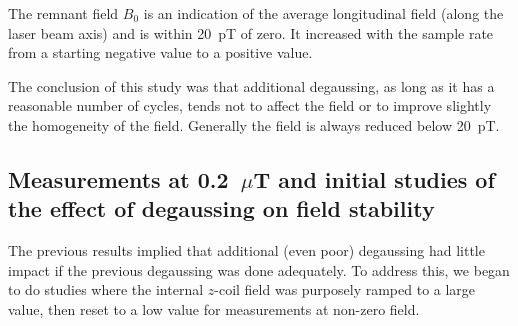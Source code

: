 The remnant field $B_0$ is an indication of the average longitudinal
field (along the laser beam axis) and is within 20~pT of zero.  It
increased with the sample rate from a starting negative value to a
positive value.

The conclusion of this study was that additional degaussing, as long
as it has a reasonable number of cycles, tends not to affect the field
or to improve slightly the homogeneity of the field.  Generally the
field is always reduced below 20~pT.



\subsection{Measurements at 0.2~$\mu$T and initial studies of the effect of degaussing on field stability}

The previous results implied that additional (even poor) degaussing
had little impact if the previous degaussing was done adequately.  To
address this, we began to do studies where the internal $z$-coil field
was purposely ramped to a large value, then reset to a low value for
measurements at non-zero field.


